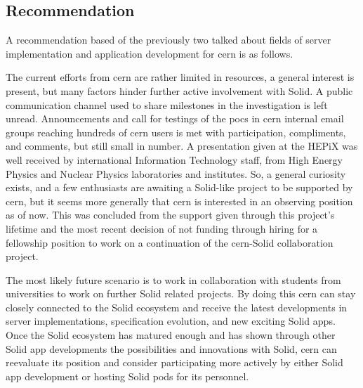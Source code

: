 \subsection{Recommendation}

A recommendation based of the previously two talked about fields of server implementation and application development for \gls{cern} is as follows.

The current efforts from \gls{cern} are rather limited in resources, a general interest is present, but many factors hinder further active involvement with Solid. A public communication channel used to share milestones in the investigation is left unread. Announcements and call for testings of the \glspl{poc} in \gls{cern} internal email groups reaching hundreds of \gls{cern} users is met with participation, compliments, and comments, but still small in number. A presentation given at the HEPiX \cite{hepix} was well received by international Information Technology staff, from High Energy Physics and Nuclear Physics laboratories and institutes. So, a general curiosity exists, and a few enthusiasts are awaiting a Solid-like project to be supported by \gls{cern}, but it seems more generally that \gls{cern} is interested in an observing position as of now. This was concluded from the support given through this project's lifetime and the most recent decision of not funding through hiring for a fellowship position to work on a continuation of the \gls{cern}-Solid collaboration project.

The most likely future scenario is to work in collaboration with students from universities to work on further Solid related projects. By doing this \gls{cern} can stay closely connected to the Solid ecosystem and receive the latest developments in server implementations, specification evolution, and new exciting Solid apps. Once the Solid ecosystem has matured enough and has shown through other Solid app developments the possibilities and innovations with Solid, \gls{cern} can reevaluate its position and consider participating more actively by either Solid app development or hosting Solid pods for its personnel.
